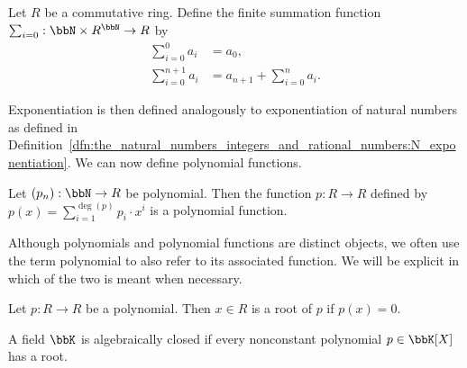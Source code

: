 \begin{definition}
    Let $R$ be a commutative ring. Define the finite summation function $\sum_{i=0}:\bbN\times R^\bbN\to R$ by
    \begin{align*}
        \sum_{i=0}^0a_i & =a_0, \\
        \sum_{i=0}^{n+1}a_i & =a_{n+1}+\sum_{i=0}^na_i.
    \end{align*}
\end{definition}
Exponentiation is then defined analogously to exponentiation of natural numbers as defined in Definition~\ref{dfn:the_natural_numbers_integers_and_rational_numbers:N_exponentiation}. We can now define polynomial functions.
\begin{definition}
    Let $(p_n):\bbN\to R$ be polynomial. Then the function $p:R\to R$ defined by $p(x)=\sum_{i=1}^{\deg(p)}p_i\cdot x^i$ is a polynomial function.
\end{definition}
Although polynomials and polynomial functions are distinct objects, we often use the term polynomial to also refer to its associated function. We will be explicit in which of the two is meant when necessary.
\begin{definition}
    Let $p:R\to R$ be a polynomial. Then $x\in R$ is a root of $p$ if $p(x)=0$.
\end{definition}
\begin{definition}
    A field $\bbK$ is algebraically closed if every nonconstant polynomial $p\in\bbK[X]$ has a root.
\end{definition}
